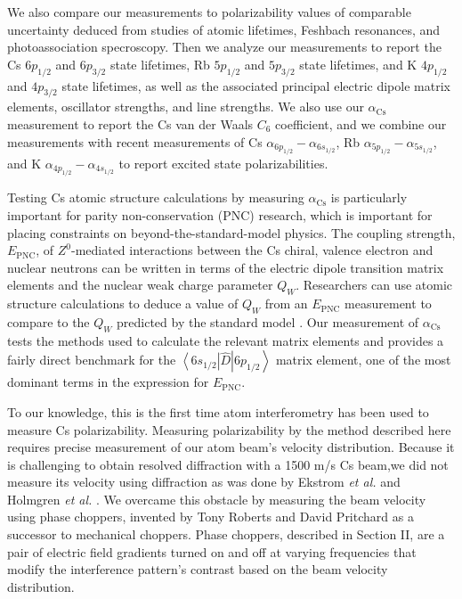 \documentclass[twocolumn,prl,showpacs,superscriptaddress]{revtex4-1}   %
\newcommand{\brakett}[3]{\left\langle #1 \right|#2\left| #3 \right\rangle}
\newcommand{\acs}{\alpha_{\textrm{Cs}}}
\newcommand{\etalspace}{\textit{et al. }}
\begin{document}
We also compare our measurements to polarizability values of comparable uncertainty deduced from studies of atomic lifetimes, Feshbach resonances, and photoassociation specroscopy. Then we analyze our measurements to report the Cs $6p_{1/2}$ and $6p_{3/2}$ state lifetimes, Rb $5p_{1/2}$ and $5p_{3/2}$ state lifetimes, and K $4p_{1/2}$ and $4p_{3/2}$ state lifetimes, as well as the associated principal electric dipole matrix elements, oscillator strengths, and line strengths. 
We also use our $\acs$ measurement to report the Cs van der Waals $C_6$ coefficient,
and we combine our measurements with recent measurements of 
Cs $\alpha_{6p_{1/2}} - \alpha_{6s_{1/2}}$,
Rb $\alpha_{5p_{1/2}} - \alpha_{5s_{1/2}}$, and
K $\alpha_{4p_{1/2}} - \alpha_{4s_{1/2}}$ to report excited state polarizabilities.

Testing Cs atomic structure calculations by measuring $\acs$ is particularly important for parity non-conservation (PNC) research, which is important for placing constraints on beyond-the-standard-model physics. The coupling strength, $E_{\mathrm{PNC}}$, of $Z^0$-mediated interactions between the Cs chiral, valence electron and nuclear neutrons can be written in terms of the electric dipole transition matrix elements and the nuclear weak charge parameter $Q_W$. Researchers can use atomic structure calculations to deduce a value of $Q_W$ from an $E_{\mathrm{PNC}}$ measurement \cite{Cho1997} to compare to the $Q_W$ predicted by the standard model \cite{Bouchiat1999,Dzuba2012}. Our measurement of $\acs$ tests the methods used to calculate the relevant matrix elements and provides a fairly direct benchmark for the $\brakett{6s_{1/2}}{\hat{D}}{6p_{1/2}}$ matrix element, one of the most dominant terms in the expression for $E_{\mathrm{PNC}}$.

To our knowledge, this is the first time atom interferometry has been used to measure Cs polarizability. Measuring polarizability by the method described here requires precise measurement of our atom beam's velocity distribution. Because it is challenging to obtain resolved diffraction with a 1500 m/s Cs beam,we did not measure its velocity using diffraction as was done by Ekstrom \etalspace and Holmgren \etalspace \cite{Ekstrom1995,Holmgren2010}. We overcame this obstacle by measuring the beam velocity using phase choppers,  invented by Tony Roberts and David Pritchard \cite{Roberts2002,Roberts2004} as a successor to mechanical choppers.
Phase choppers, described in Section II, are a pair of electric field gradients turned on and off at varying frequencies that modify the interference pattern's contrast based on the beam velocity distribution. 
\end{document}
